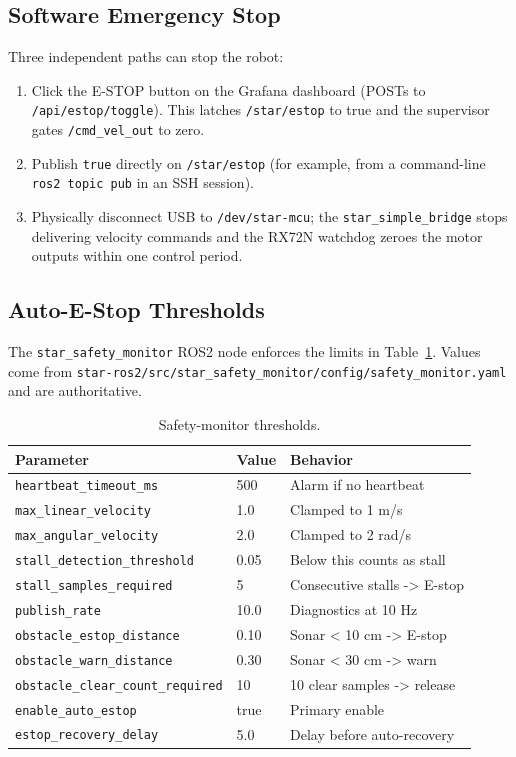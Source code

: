 \documentclass[11pt,letterpaper]{article}
\begin{document}
\subsection{Software Emergency Stop}
Three independent paths can stop the robot:
\begin{enumerate}[leftmargin=1.4em,itemsep=2pt]
\item Click the E-STOP button on the Grafana dashboard
      (POSTs to \texttt{/api/estop/toggle}). This latches
      \texttt{/star/estop} to true and the supervisor gates
      \texttt{/cmd\_vel\_out} to zero.
\item Publish \texttt{true} directly on \texttt{/star/estop} (for
      example, from a command-line \texttt{ros2 topic pub} in an
      SSH session).
\item Physically disconnect USB to \texttt{/dev/star-mcu}; the
      \texttt{star\_simple\_bridge} stops delivering velocity
      commands and the RX72N watchdog zeroes the motor outputs
      within one control period.
\end{enumerate}

\subsection{Auto-E-Stop Thresholds}
The \texttt{star\_safety\_monitor} ROS2 node enforces the limits in
Table~\ref{tab:safety}. Values come from
\texttt{star-ros2/src/star\_safety\_monitor/config/safety\_monitor.yaml}
and are authoritative.

\begin{table}[H]
\centering
\caption{Safety-monitor thresholds.}
\label{tab:safety}
\small
\begin{tabularx}{\linewidth}{l l X}
\toprule
\textbf{Parameter} & \textbf{Value} & \textbf{Behavior} \\
\midrule
\texttt{heartbeat\_timeout\_ms}     & 500   & Alarm if no heartbeat \\
\texttt{max\_linear\_velocity}      & 1.0   & Clamped to 1 m/s \\
\texttt{max\_angular\_velocity}     & 2.0   & Clamped to 2 rad/s \\
\texttt{stall\_detection\_threshold} & 0.05 & Below this counts as stall \\
\texttt{stall\_samples\_required}   & 5     & Consecutive stalls -> E-stop \\
\texttt{publish\_rate}              & 10.0  & Diagnostics at 10 Hz \\
\texttt{obstacle\_estop\_distance}  & 0.10  & Sonar < 10 cm -> E-stop \\
\texttt{obstacle\_warn\_distance}   & 0.30  & Sonar < 30 cm -> warn \\
\texttt{obstacle\_clear\_count\_required} & 10 & 10 clear samples -> release \\
\texttt{enable\_auto\_estop}        & true  & Primary enable \\
\texttt{estop\_recovery\_delay}     & 5.0   & Delay before auto-recovery \\
\bottomrule
\end{tabularx}
\end{table}
\end{document}
